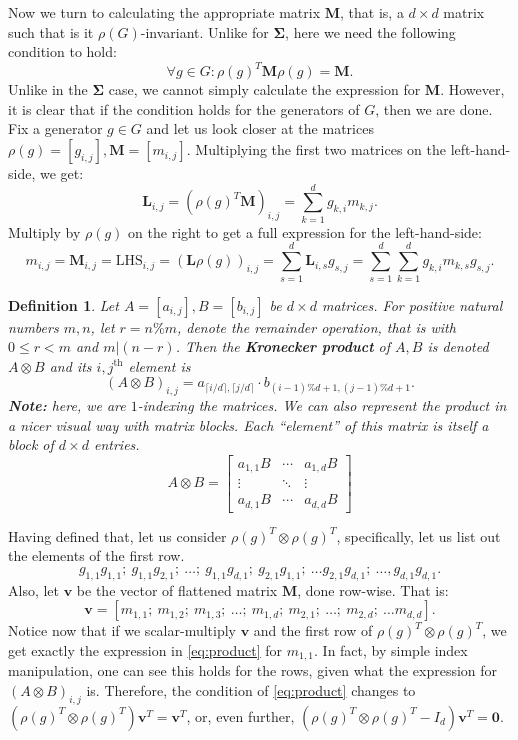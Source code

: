 \documentclass[11pt]{article}
\newtheorem{definition}[theorem]{Definition}
\begin{document}
Now we turn to calculating the appropriate matrix $\mathbf{M}$, that is, a $d\times d$
matrix such that is it $\rho(G)$-invariant.
Unlike for $\mathbf{\Sigma}$, here we need the following condition to hold:
\[\forall g \in G: \rho(g)^T\mathbf{M}\rho(g) = \mathbf{M}. \label{eq:m_require}\tag{$\dagger$}\]
Unlike in the $\mathbf{\Sigma}$ case, we cannot simply calculate the expression for $\mathbf{M}$.
However, it is clear that if the condition holds for the generators of $G$, then we are done.
Fix a generator $g \in G$ and let us look closer at the matrices $\rho(g) = [g_{i,j}], \mathbf{M} = [m_{i,j}]$.
Multiplying the first two matrices on the left-hand-side, we get:
\[\mathbf{L}_{i,j} = (\rho(g)^T\mathbf{M})_{i,j} = \sum_{k=1}^{d}g_{k,i}m_{k,j}.\]
Multiply by $\rho(g)$ on the right to get a full expression for the left-hand-side:
\[m_{i,j} = \mathbf{M}_{i,j} = \text{LHS}_{i,j} = (\mathbf{L}\rho(g))_{i,j} =
\sum_{s=1}^{d}\mathbf{L}_{i,s}g_{s,j} = \sum_{s=1}^{d}\sum_{k=1}^{d}g_{k,i}m_{k,s}g_{s,j}. \label{eq:product} \tag{$\clubsuit$}\]
\begin{definition}
  Let $A = [a_{i,j}], B = [b_{i,j}]$ be $d\times d$ matrices. For positive natural numbers $m,n$, let
  $r = n \% m$, denote the remainder operation, that is with $0 \leq r < m$ and $m|(n-r)$.
  Then the \textbf{Kronecker product} of $A, B$ is denoted $A \otimes B$ and its
  $i,j^\text{th}$ element is \[(A \otimes B)_{i,j} = a_{\lceil i/d \rceil, \lceil j/d \rceil}\cdot b_{(i-1)\%d+1,(j-1)\%d+1}.\]
  \textbf{Note:} here, we are $1$-indexing the matrices.
  We can also represent the product in a nicer visual way with matrix blocks. Each ``element'' of this matrix is itself a block of $d\times d$ entries.
  \[A \otimes B = \begin{bmatrix} a_{1,1}B & \cdots & a_{1,d}B\\ \vdots & \ddots & \vdots \\ a_{d,1}B & \cdots & a_{d,d}B\end{bmatrix}\]
\end{definition}
Having defined that, let us consider $\rho(g)^T \otimes \rho(g)^T$, specifically, let us list out the elements of the first row.
\[g_{1,1}g_{1,1};~g_{1,1}g_{2,1};~\ldots;~g_{1,1}g_{d,1};~g_{2,1}g_{1,1};~\ldots g_{2,1}g_{d,1};~\ldots, g_{d,1}g_{d,1}.\]
Also, let $\mathbf{v}$ be the vector of flattened matrix $\mathbf{M}$, done row-wise. That is:
\[\mathbf{v} = [m_{1,1};~ m_{1,2};~ m_{1,3};~ \ldots;~ m_{1,d};~ m_{2,1};~ \ldots;~ m_{2,d};~ \ldots m_{d,d}].\]
Notice now that if we scalar-multiply $\mathbf{v}$ and the first row of $\rho(g)^T \otimes \rho(g)^T$, we get exactly
the expression in \cref{eq:product} for $m_{1,1}$. In fact, by simple index manipulation, one
can see this holds for the rows, given what the expression for $(A \otimes B)_{i,j}$ is.
Therefore, the condition of \cref{eq:product} changes to $\left(\rho(g)^T \otimes \rho(g)^T\right)\mathbf{v}^T = \mathbf{v}^T$,
or, even further, $\left(\rho(g)^T \otimes \rho(g)^T - I_d\right)\mathbf{v}^T = \mathbf{0}$.
\end{document}
